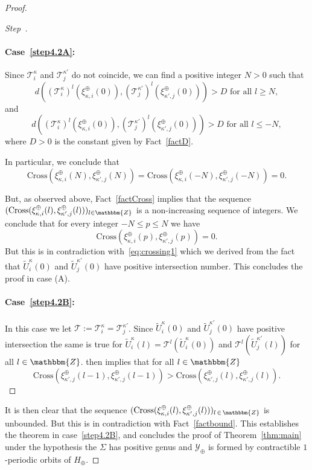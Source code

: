 \documentclass[AHL,Unicode,longabstracts,published]{cedram}
\newcommand{\Z}{\mathbbm{Z}}
\newcommand{\Cross}{\mathrm{Cross}}
\newcommand{\clY}{\mathcal{Y}}
\newcommand{\clT}{\mathcal{T}}
\newcounter{stepcount}
\newenvironment{step}{\refstepcounter{stepcount}\begin{proof}[Step~\thestepcount]}{\let\qed\relax\end{proof}}
\begin{document}
\begin{proof}
\begin{step}
\paragraph{Case~\eqref{step4.2A}:}
Since $\clT^{\kappa}_i$ and $\clT^{\kappa'}_j$ do not coincide, we can find a positive integer $N>0$ such that
\[
d\left((\clT^{\kappa}_i)^l\left(\xi^{\oplus}_{\kappa,i}(0)\right),(\clT^{\kappa'}_j)^l\left(\xi^{\oplus}_{\kappa',j}(0)\right)\right) > D \text{ for all } l\geq N,
\]
and
\[
d\left((\clT^{\kappa}_i)^l\left(\xi^{\oplus}_{\kappa,i}(0)\right),\left(\clT^{\kappa'}_j\right)^l\left(\xi^{\oplus}_{\kappa',j}(0)\right)\right) > D \text{ for all } l\leq -N,
\]
where $D>0$ is the constant given by Fact~\ref{factD}.

In particular, we conclude that
\[
\Cross\left(\xi^{\oplus}_{\kappa,i}(N),\xi^{\oplus}_{\kappa',j}(N)\right)= \Cross\left(\xi^{\oplus}_{\kappa,i}(-N),\xi^{\oplus}_{\kappa',j}(-N)\right)=0.
\]

But, as observed above, Fact~\ref{factCross} implies that the sequence $(\Cross(\xi^{\oplus}_{\kappa,i}(l),\xi^{\oplus}_{\kappa',j}(l)))_{l\in\Z}$ is a non-increasing sequence of integers. We conclude that for every integer $-N \leq p \leq N$ we have
\[
\Cross\left(\xi^{\oplus}_{\kappa,i}(p),\xi^{\oplus}_{\kappa',j}(p)\right)=0.
\]
But this is in contradiction with~\eqref{eq:crossing1} which we derived from the fact that $\widetilde{U}^\kappa_i(0)$ and $\widetilde{U}^{\kappa'}_j(0)$ have positive intersection number. This concludes the proof in case (A).

\paragraph{Case~\eqref{step4.2B}:}
In this case we let $\clT:= \clT^{\kappa}_i = \clT^{\kappa'}_j$. Since $\widetilde{U}^\kappa_i(0)$ and $\widetilde{U}^{\kappa'}_j(0)$ have positive intersection the same is true for $\widetilde{U}^\kappa_i(l) = \clT^l(\widetilde{U}^\kappa_i(0))$ and $\clT^l(\widetilde{U}^{\kappa'}_j(l))$ for all $l \in \Z$. \cite[Lemma~5.4]{BraidFloer} then implies that for all $l \in \Z$
\begin{equation}\label{eq:crossing}
\Cross\left(\xi^{\oplus}_{\kappa',j}(l-1),\xi^{\oplus}_{\kappa',j}(l-1)\right) > \Cross\left(\xi^{\oplus}_{\kappa',j}(l),\xi^{\oplus}_{\kappa',j}(l)\right).
\end{equation}
\end{step}
It is then clear that the sequence $(\Cross(\xi^{\oplus}_{\kappa,i}(l),\xi^{\oplus}_{\kappa',j}(l)))_{l\,\in\,\Z}$ is unbounded. But this is in contradiction with Fact~\ref{factbound}. This establishes the theorem in case~\eqref{step4.2B}, and concludes the proof of Theorem~\ref{thm:main} under the hypothesis the $\Sigma$ has positive genus and $\clY_\oplus$ is formed by contractible $1$-periodic orbits of $H_\oplus$. 
\end{proof}
\end{document}
